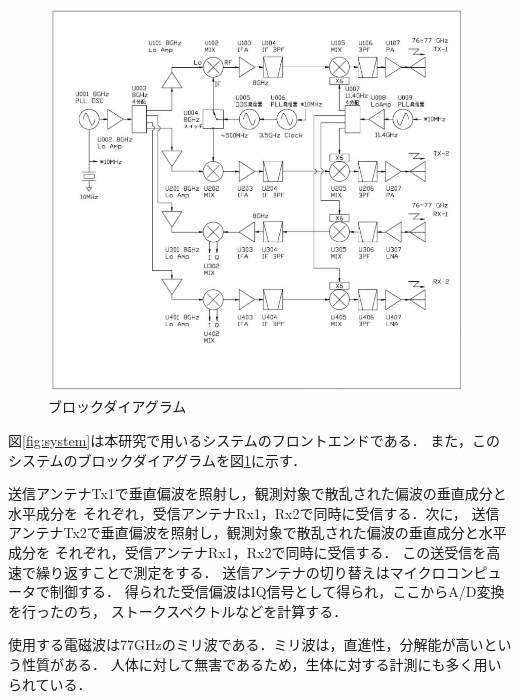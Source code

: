 \documentclass[uplatex,a4paper]{jsarticle}
\begin{document}
\begin{figure}[hbtp]
	\centering
	\includegraphics[width=110mm]{../img/diagram.png}
    \caption{ブロックダイアグラム}
	\label{fig:diagram}
\end{figure}

図\ref{fig:system}は本研究で用いるシステムのフロントエンドである．
また，このシステムのブロックダイアグラムを図\ref{fig:diagram}に示す．

送信アンテナTx1で垂直偏波を照射し，観測対象で散乱された偏波の垂直成分と水平成分を
それぞれ，受信アンテナRx1，Rx2で同時に受信する．次に，
送信アンテナTx2で垂直偏波を照射し，観測対象で散乱された偏波の垂直成分と水平成分を
それぞれ，受信アンテナRx1，Rx2で同時に受信する．
この送受信を高速で繰り返すことで測定をする．
送信アンテナの切り替えはマイクロコンピュータで制御する．
得られた受信偏波はIQ信号として得られ，ここからA/D変換を行ったのち，
ストークスベクトルなどを計算する．

使用する電磁波は77GHzのミリ波である．ミリ波は，直進性，分解能が高いという性質がある．
人体に対して無害であるため，生体に対する計測にも多く用いられている．
\end{document}
